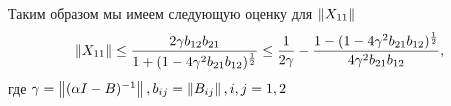 Таким образом мы имеем следующую оценку для $\left\|X_{11}\right\|$
$$
	\left\|X_{11}\right\| \leq \frac{2\gamma b_{12}b_{21}}{1 + (1 - 4\gamma^2 b_{21}b_{12})^{\frac{1}{2}}} \leq \frac{1}{2\gamma} - \frac{1 - (1 - 4\gamma^2 b_{21}b_{12})^{\frac{1}{2}}}{4\gamma^2 b_{21}b_{12}},
$$
где $\gamma = \left\|(\alpha I - B)^{-1}\right\|, b_{ij} = \left\|B_{ij}\right\|, i,j=1,2$ 